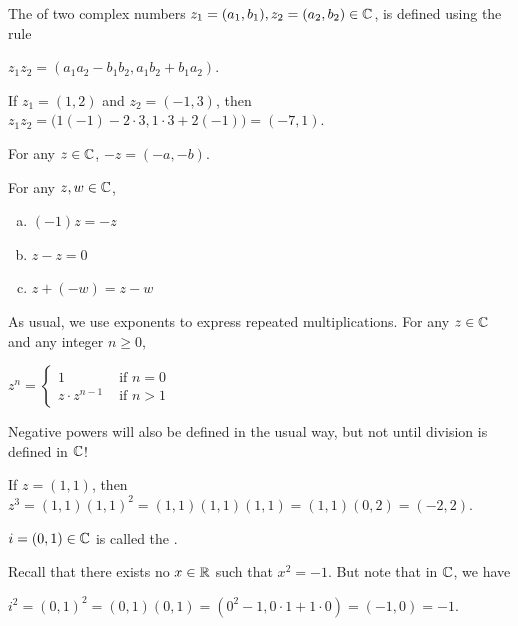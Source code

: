 \documentclass[11pt,fleqn,dvipsnames,usenames]{article}
\begin{document}
\begin{definition}\label{complexmultiplication}
The  of two complex numbers $z_{1} = (a_{1},b_{1}), z_{2} = (a_{2},b_{2})\in\mathbb{C}$, is defined using the rule
\begin{center}
$z_{1}z_{2} = (a_{1}a_{2} - b_{1}b_{2}, a_{1}b_{2} + b_{1}a_{2})$.
\end{center}
\end{definition}

\begin{example}\label{examplecomplexmultiplication}
If $z_{1} = (1,2)$ and $z_{2} = (-1,3)$, then $z_{1}z_{2} = \Big(1(-1) - 2\cdot 3, 1\cdot 3 + 2(-1)\Big) = (-7,1)$.
\end{example}

\notation For any $z\in\mathbb{C}$, $-z = (-a,-b)$.
\vsp

\properties For any $z,w\in\mathbb{C}$,
\begin{enumerate}[(a)]
\item $(-1)z = -z$
\item $z - z = 0$
\item $z + (-w) = z - w$
\end{enumerate}
\vsp

\notation As usual, we use exponents to express repeated multiplications.  For any $z\in\mathbb{C}$ and any integer $n\geq 0$,
\begin{center}
$z^{n} = \begin{cases} 1 & \text{ if }n = 0\\z\cdot z^{n-1} &\text{ if }n > 1\end{cases}$
\end{center}

\note Negative powers will also be defined in the usual way, but not until division is defined in $\mathbb{C}$!

\begin{example}
If $z = (1,1)$, then $z^3 = (1,1)(1,1)^2 = (1,1)(1,1)(1,1) = (1,1)(0,2) = (-2, 2)$.
\end{example}

\terminology $i = (0,1)\in\mathbb{C}$ is called the .
\vsp

\observation Recall that there exists no $x\in\mathbb{R}$ such that $x^2 = -1$.  But note that in $\mathbb{C}$, we have
\begin{center}
$i^2 = (0,1)^2 = (0,1)(0,1) = (0^2 - 1, 0\cdot 1 + 1\cdot 0) = (-1,0) = -1$.
\end{center}
\vsp
\end{document}
